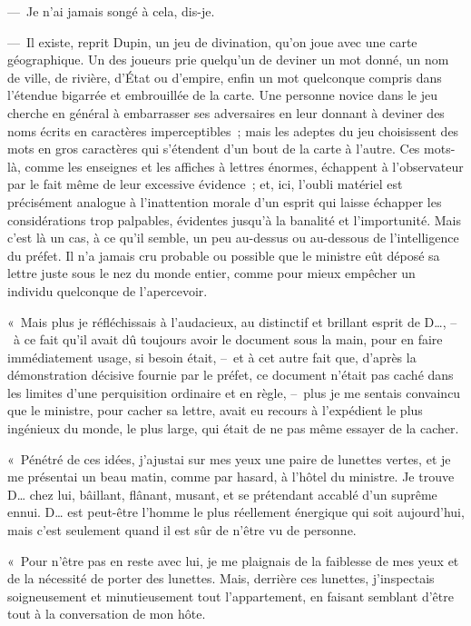 \documentclass[french,twoside]{book} %
\begin{document}
— Je n’ai jamais songé à cela, dis-je.\par
— Il existe, reprit Dupin, un jeu de divination, qu’on joue avec une carte géographique. Un des joueurs prie quelqu’un de deviner un mot donné, un nom de ville, de rivière, d’État ou d’empire, enfin un mot quelconque compris dans l’étendue bigarrée et embrouillée de la carte. Une personne novice dans le jeu cherche en général à embarrasser ses adversaires en leur donnant à deviner des noms écrits en caractères imperceptibles ; mais les adeptes du jeu choisissent des mots en gros caractères qui s’étendent d’un bout de la carte à l’autre. Ces mots-là, comme les enseignes et les affiches à lettres énormes, échappent à l’observateur par le fait même de leur excessive évidence ; et, ici, l’oubli matériel est précisément analogue à l’inattention morale d’un esprit qui laisse échapper les considérations trop palpables, évidentes jusqu’à la banalité et l’importunité. Mais c’est là un cas, à ce qu’il semble, un peu au-dessus ou au-dessous de l’intelligence du préfet. Il n’a jamais cru probable ou possible que le ministre eût déposé sa lettre juste sous le nez du monde entier, comme pour mieux empêcher un individu quelconque de l’apercevoir.\par
« Mais plus je réfléchissais à l’audacieux, au distinctif et brillant esprit de D…, – à ce fait qu’il avait dû toujours avoir le document sous la main, pour en faire immédiatement usage, si besoin était, – et à cet autre fait que, d’après la démonstration décisive fournie par le préfet, ce document n’était pas caché dans les limites d’une perquisition ordinaire et en règle, – plus je me sentais convaincu que le ministre, pour cacher sa lettre, avait eu recours à l’expédient le plus ingénieux du monde, le plus large, qui était de ne pas même essayer de la cacher.\par
« Pénétré de ces idées, j’ajustai sur mes yeux une paire de lunettes vertes, et je me présentai un beau matin, comme par hasard, à l’hôtel du ministre. Je trouve D… chez lui, bâillant, flânant, musant, et se prétendant accablé d’un suprême ennui. D… est peut-être l’homme le plus réellement énergique qui soit aujourd’hui, mais c’est seulement quand il est sûr de n’être vu de personne.\par
« Pour n’être pas en reste avec lui, je me plaignais de la faiblesse de mes yeux et de la nécessité de porter des lunettes. Mais, derrière ces lunettes, j’inspectais soigneusement et minutieusement tout l’appartement, en faisant semblant d’être tout à la conversation de mon hôte.\par
\end{document}
